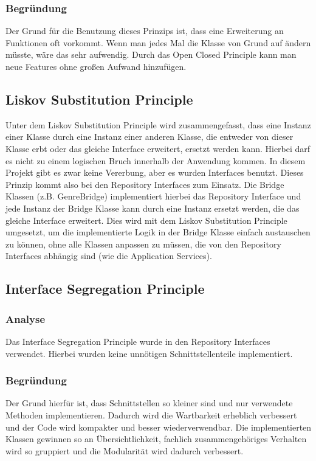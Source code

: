        \subsubsection{Begründung}
        Der Grund für die Benutzung dieses Prinzips ist, dass eine Erweiterung an Funktionen oft vorkommt. Wenn man jedes Mal die Klasse von Grund auf ändern müsste, wäre das sehr aufwendig. Durch das Open Closed Principle kann man neue Features ohne großen Aufwand hinzufügen.

    \subsection{Liskov Substitution Principle}
        Unter dem Liskov Substitution Principle wird zusammengefasst, dass eine Instanz einer Klasse durch eine Instanz einer anderen Klasse, die entweder von dieser Klasse erbt oder das gleiche Interface erweitert, ersetzt werden kann. Hierbei darf es nicht zu einem logischen Bruch innerhalb der Anwendung kommen. In diesem Projekt gibt es zwar keine Vererbung, aber es wurden Interfaces benutzt. Dieses Prinzip kommt also bei den Repository Interfaces zum Einsatz. Die Bridge Klassen (z.B. GenreBridge) implementiert hierbei das Repository Interface und jede Instanz der Bridge Klasse kann durch eine Instanz ersetzt werden, die das gleiche Interface erweitert. Dies wird mit dem Liskov Substitution Principle umgesetzt, um die implementierte Logik in der Bridge Klasse einfach austauschen zu können, ohne alle Klassen anpassen zu müssen, die von den Repository Interfaces abhängig sind (wie die Application Services).

    \subsection{Interface Segregation Principle}
    
        \subsubsection{Analyse}
        Das Interface Segregation Principle wurde in den Repository Interfaces verwendet. Hierbei wurden keine unnötigen Schnittstellenteile implementiert.
        
        \subsubsection{Begründung}
        Der Grund hierfür ist, dass Schnittstellen so kleiner sind und nur verwendete Methoden implementieren. Dadurch wird die Wartbarkeit erheblich verbessert und der Code wird kompakter und besser wiederverwendbar. Die implementierten Klassen gewinnen so an Übersichtlichkeit, fachlich zusammengehöriges Verhalten wird so gruppiert und die Modularität wird dadurch verbessert.

